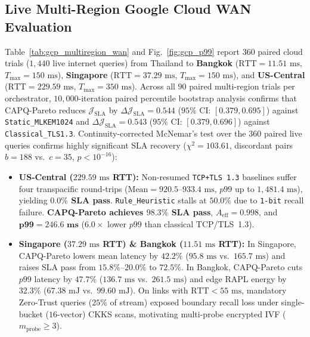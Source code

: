 \documentclass[10pt,journal,compsoc]{IEEEtran}
\begin{document}
\subsection{Live Multi-Region Google Cloud WAN Evaluation}
Table~\ref{tab:gcp_multiregion_wan} and Fig.~\ref{fig:gcp_p99} report $360$ paired cloud trials ($1{,}440$ live internet queries) from Thailand to \textbf{Bangkok} ($\text{RTT}=11.51\text{ ms}$, $T_{\max}=150\text{ ms}$), \textbf{Singapore} ($\text{RTT}=37.29\text{ ms}$, $T_{\max}=150\text{ ms}$), and \textbf{US-Central} ($\text{RTT}=229.59\text{ ms}$, $T_{\max}=350\text{ ms}$). Across all $90$ paired multi-region trials per orchestrator, $10{,}000$-iteration paired percentile bootstrap analysis \cite{efron1979bootstrap} confirms that CAPQ-Pareto reduces $\mathcal{J}_{\text{SLA}}$ by $\Delta\mathcal{J}_{\text{SLA}} = 0.544$ ($95\%$ CI: $[0.379, 0.695]$) against \texttt{Static\_\allowbreak MLKEM1024} and $\Delta\mathcal{J}_{\text{SLA}} = 0.543$ ($95\%$ CI: $[0.379, 0.696]$) against \texttt{Classical\_\allowbreak TLS1.3}. Continuity-corrected McNemar's test \cite{mcnemar1947note} over the $360$ paired live queries confirms highly significant SLA recovery ($\chi^2 = 103.61$, discordant pairs $b=188$ vs.\ $c=35$, $p < 10^{-16}$):
\begin{itemize}
    \item \textbf{US-Central ($229.59\text{ ms}$ RTT):} Non-resumed \texttt{TCP+TLS~1.3} baselines suffer four transpacific round-trips ($\text{Mean}=920.5$--$933.4\text{ ms}$, $p99$ up to $1{,}481.4\text{ ms}$), yielding \textbf{$0.0\%$ SLA pass}. \texttt{Rule\_\allowbreak Heuristic} stalls at $50.0\%$ due to \texttt{1-bit} recall failure. \textbf{CAPQ-Pareto achieves $98.3\%$ SLA pass}, $A_{\text{eff}} = 0.998$, and $\mathbf{p99 = 246.6\text{ ms}}$ ($6.0\times$ lower $p99$ than classical TCP/TLS~1.3).
    \item \textbf{Singapore ($37.29\text{ ms}$ RTT) \& Bangkok ($11.51\text{ ms}$ RTT):} In Singapore, CAPQ-Pareto lowers mean latency by $42.2\%$ ($95.8\text{ ms}$ vs.\ $165.7\text{ ms}$) and raises SLA pass from $15.8\%$--$20.0\%$ to $72.5\%$. In Bangkok, CAPQ-Pareto cuts $p99$ latency by $47.7\%$ ($136.7\text{ ms}$ vs.\ $261.5\text{ ms}$) and edge RAPL energy by $32.3\%$ ($67.38\text{ mJ}$ vs.\ $99.60\text{ mJ}$). On links with $\text{RTT}<55\text{ ms}$, mandatory Zero-Trust queries ($25\%$ of stream) exposed boundary recall loss under single-bucket ($16$-vector) CKKS scans, motivating multi-probe encrypted IVF ($m_{\text{probe}} \ge 3$).
\end{itemize}
\end{document}
